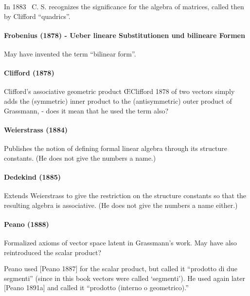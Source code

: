 In 1883~\cite{Peirce1883} C. S. recognizes the significance for the algebra of matrices, called then by Clifford ``quadrics''.

\paragraph{Frobenius (1878) - Ueber lineare Substitutionen und bilineare Formen}

May have invented the term ``bilinear form''.



\paragraph{Clifford (1878)~\cite{Clifford1878}}

Clifford’s associative geometric product ŒClifford 1878 of two vectors simply adds the
(symmetric) inner product to the (antisymmetric) outer product of Grassmann, - does it mean that he used the term also?


\paragraph{Weierstrass (1884)~\cite{Weierstrass1884}}

Publishes the notion of defining formal linear algebra through its structure constants. (He does not give the numbers a name.)

\paragraph{Dedekind (1885)~\cite{Dedekind1885}}

Extends Weierstrass to give the restriction on the structure constants so that the resulting algebra is associative. (He does not give the numbers a name either.)





\paragraph{Peano (1888)~\cite{Peano1888}}

Formalized axioms of vector space latent in Grassmann's work.
May have also reintroduced the scalar product?

Peano used [Peano 1887]
for the scalar product, but called it “prodotto di due segmenti” (since in this book vectors
were called ‘segmenti’). He used
again later [Peano 1891a] and called it “prodotto
(interno o geometrico).”

